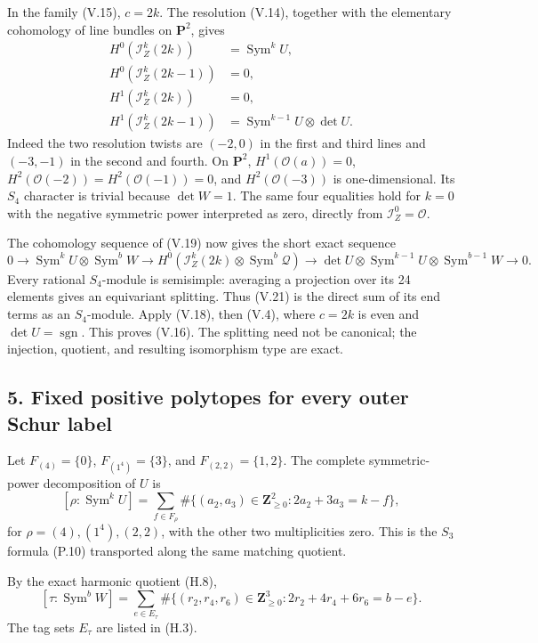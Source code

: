 \documentclass[
  10pt,
]{article}
\begin{document}
In the family (V.15), \(c=2k\). The resolution (V.14), together with the
elementary cohomology of line bundles on \(\mathbf P^2\), gives \[
\begin{aligned}
H^0(\mathcal I_Z^k(2k))&=\operatorname{Sym}^k U,\\
H^0(\mathcal I_Z^k(2k-1))&=0,\\
H^1(\mathcal I_Z^k(2k))&=0,\\
H^1(\mathcal I_Z^k(2k-1))
&=\operatorname{Sym}^{k-1}U\otimes\det U.
\end{aligned}
\tag{V.20}
\] Indeed the two resolution twists are \((-2,0)\) in the first and
third lines and \((-3,-1)\) in the second and fourth. On
\(\mathbf P^2\), \(H^1(\mathcal O(a))=0\),
\(H^2(\mathcal O(-2))=H^2(\mathcal O(-1))=0\), and
\(H^2(\mathcal O(-3))\) is one-dimensional. Its \(S_4\) character is
trivial because \(\det W=1\). The same four equalities hold for \(k=0\)
with the negative symmetric power interpreted as zero, directly from
\(\mathcal I_Z^0=\mathcal O\).

The cohomology sequence of (V.19) now gives the short exact sequence \[
0\to
\operatorname{Sym}^kU\otimes\operatorname{Sym}^bW
\to
H^0(\mathcal I_Z^k(2k)\otimes\operatorname{Sym}^b\mathcal Q)
\to
\det U\otimes\operatorname{Sym}^{k-1}U\otimes
\operatorname{Sym}^{b-1}W
\to0.
\tag{V.21}
\] Every rational \(S_4\)-module is semisimple: averaging a projection
over its 24 elements gives an equivariant splitting. Thus (V.21) is the
direct sum of its end terms as an \(S_4\)-module. Apply (V.18), then
(V.4), where \(c=2k\) is even and \(\det U=\operatorname{sgn}\). This
proves (V.16). The splitting need not be canonical; the injection,
quotient, and resulting isomorphism type are exact.

\subsection{5. Fixed positive polytopes for every outer Schur
label}\label{fixed-positive-polytopes-for-every-outer-schur-label}

Let \(F_{(4)}=\{0\}\), \(F_{(1^4)}=\{3\}\), and \(F_{(2,2)}=\{1,2\}\).
The complete symmetric-power decomposition of \(U\) is \[
[\rho:\operatorname{Sym}^kU]
=\sum_{f\in F_\rho}
\#\{(a_2,a_3)\in\mathbf Z_{\ge0}^2:2a_2+3a_3=k-f\},
\tag{V.22}
\] for \(\rho=(4),(1^4),(2,2)\), with the other two multiplicities zero.
This is the \(S_3\) formula (P.10) transported along the same matching
quotient.

By the exact harmonic quotient (H.8), \[
[\tau:\operatorname{Sym}^{b}W]
=\sum_{e\in E_\tau}
\#\{(r_2,r_4,r_6)\in\mathbf Z_{\ge0}^3:
2r_2+4r_4+6r_6=b-e\}.
\tag{V.23}
\] The tag sets \(E_\tau\) are listed in (H.3).
\end{document}
